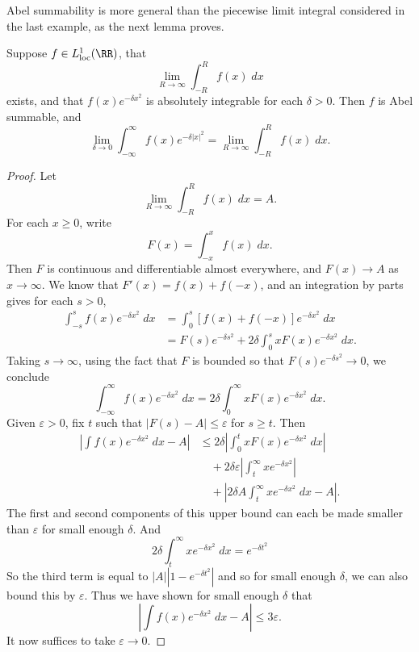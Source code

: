 Abel summability is more general than the piecewise limit integral considered in the last example, as the next lemma proves.

\begin{lemma}
    Suppose $f \in L^1_{\text{loc}}(\RR)$, that
    \[ \lim_{R \to \infty} \int_{-R}^R f(x)\; dx \]
    exists, and that $f(x) e^{-\delta x^2}$ is absolutely integrable for each $\delta > 0$. Then $f$ is Abel summable, and
    \[ \lim_{\delta \to 0} \int_{-\infty}^\infty f(x) e^{-\delta |x|^2} = \lim_{R \to \infty} \int_{-R}^R f(x)\; dx. \]
\end{lemma}
\begin{proof}
    Let
    \[ \lim_{R \to \infty} \int_{-R}^R f(x)\; dx = A. \]
    For each $x \geq 0$, write
    \[ F(x) = \int_{-x}^x f(x)\; dx. \]
    Then $F$ is continuous and differentiable almost everywhere, and $F(x) \to A$ as $x \to \infty$. We know that $F'(x) = f(x) + f(-x)$, and an integration by parts gives for each $s > 0$,
    \begin{align*}
        \int_{-s}^s f(x) e^{-\delta x^2}\; dx &= \int_0^s [f(x) + f(-x)] e^{-\delta x^2}\; dx\\
        &= F(s) e^{-\delta s^2} + 2 \delta \int_0^s x F(x) e^{-\delta x^2}\; dx.
    \end{align*}
    Taking $s \to \infty$, using the fact that $F$ is bounded so that $F(s) e^{-\delta s^2} \to 0$, we conclude
    \[ \int_{-\infty}^\infty f(x) e^{-\delta x^2}\; dx = 2 \delta \int_0^\infty x F(x) e^{-\delta x^2}\; dx. \]
    Given $\varepsilon > 0$, fix $t$ such that $|F(s) - A| \leq \varepsilon$ for $s \geq t$. Then
    \begin{align*}
        \left| \int f(x) e^{-\delta x^2}\; dx - A \right| &\leq 2 \delta \left| \int_0^t x F(x) e^{-\delta x^2}\; dx \right|\\
        &\quad + 2 \delta \varepsilon \left| \int_t^\infty x e^{-\delta x^2} \right|\\
        &\quad + \left| 2 \delta A \int_t^\infty x e^{-\delta x^2}\; dx - A \right|.
    \end{align*}
    The first and second components of this upper bound can each be made smaller than $\varepsilon$ for small enough $\delta$. And
    \[ 2 \delta \int_t^\infty x e^{-\delta x^2}\; dx = e^{-\delta t^2} \]
    So the third term is equal to $|A| |1 - e^{-\delta t^2}|$ and so for small enough $\delta$, we can also bound this by $\varepsilon$. Thus we have shown for small enough $\delta$ that
    \[ \left| \int f(x) e^{-\delta x^2}\; dx - A \right| \leq 3 \varepsilon. \]
    It now suffices to take $\varepsilon \to 0$.
\end{proof}

